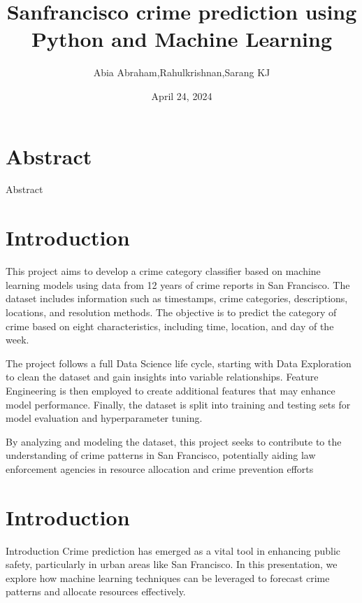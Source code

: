 \documentclass{beamer}
\title{Sanfrancisco crime prediction using Python and Machine Learning}
\author{Abia Abraham,Rahulkrishnan,Sarang KJ}
\date{April 24, 2024}
\begin{document}
\begin{frame}
  \titlepage
\end{frame}

\section{Abstract}
\begin{frame}{Abstract}
\section{Introduction}
This project aims to develop a crime category classifier based on machine learning models using data from 12 years of crime reports in San Francisco. The dataset includes information such as timestamps, crime categories, descriptions, locations, and resolution methods. The objective is to predict the category of crime based on eight characteristics, including time, location, and day of the week.

The project follows a full Data Science life cycle, starting with Data Exploration to clean the dataset and gain insights into variable relationships. Feature Engineering is then employed to create additional features that may enhance model performance. Finally, the dataset is split into training and testing sets for model evaluation and hyperparameter tuning.

By analyzing and modeling the dataset, this project seeks to contribute to the understanding of crime patterns in San Francisco, potentially aiding law enforcement agencies in resource allocation and crime prevention efforts
\end{frame}


\section{Introduction}
\begin{frame}{Introduction}
  Crime prediction has emerged as a vital tool in enhancing public safety, particularly in urban areas like San Francisco. In this presentation, we explore how machine learning techniques can be leveraged to forecast crime patterns and allocate resources effectively.
\end{frame}
\end{document}
